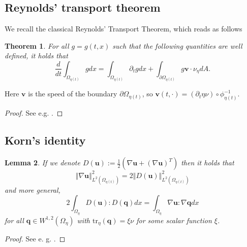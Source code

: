\documentclass[10pt,a4paper]{article}
\newtheorem{theorem}{Theorem}[section]
\newtheorem{lemma}[theorem]{Lemma}
\numberwithin{equation}{section}
\begin{document}
\subsection{Reynolds' transport theorem}
We  recall the classical  Reynolds' Transport Theorem, which reads as follows
\begin{theorem}\label{thm:Reynolds-chap-appendix}
For all $g=g(t,x)$ such that the following quantities are well defined, it holds that 
\begin{equation}
    \frac{d}{dt}\int_{\Omega_{\eta\left(t\right)}}gdx=\int_{\Omega_{\eta\left(t\right)}}\partial_{t}gdx+\int_{\partial\Omega_{\eta\left(t\right)}}g\mathbf{v}\cdot\nu_{\eta}dA.
\end{equation}
\end{theorem}
Here $\mathbf{v}$ is the speed of the boundary $\partial\Omega_{\eta(t)}$, so $\mathbf{v}\left(t,\cdot\right)=\left(\partial_{t}\eta\nu\right)\circ\phi_{\eta\left(t\right)}^{-1}$.
\begin{proof}
    See e.g. \cite{Gurtin81}.
\end{proof} 
\subsection{Korn's identity}
\begin{lemma}\label{lm:Korn} If we denote $D\left(\mathbf{u}\right):=\frac{1}{2}\left(\nabla\mathbf{u}+\left(\nabla\mathbf{u}\right)^{T}\right)$ then it holds that \[\left\Vert \nabla\mathbf{u}\right\Vert _{L^{2}\left(\Omega_{\eta\left(t\right)}\right)}^{2}=2\left\Vert D\left(\mathbf{u}\right)\right\Vert _{L^{2}\left(\Omega_{\eta\left(t\right)}\right)}^{2} \]
and more general, 
\[
2\int_{\Omega_{\eta}}D\left(\mathbf{u}\right):D\left(\mathbf{q}\right)dx=\int_{\Omega_{\eta}}\nabla\mathbf{u}:\nabla\mathbf{q}dx
\]
for all $\mathbf{q}\in W^{1,2}\left(\Omega_{\eta}\right)$ with $\text{tr}_{\eta}\left(\mathbf{q}\right)=\xi\nu$ for some scalar function $\xi$.
\end{lemma}
\begin{proof}
    See e. g. \cite[Lemma A.5]{LR14}.
\end{proof}
\end{document}
